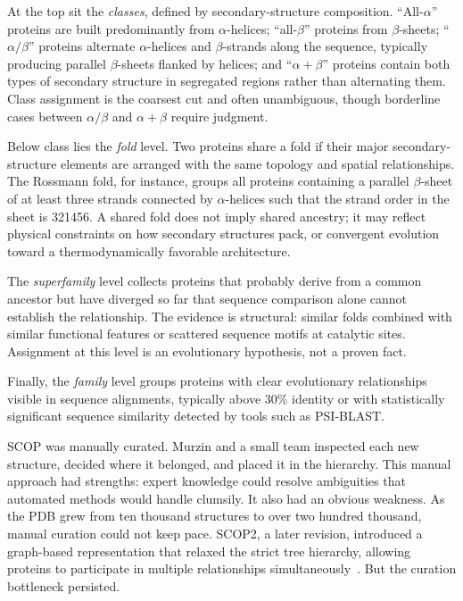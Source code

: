 At the top sit the \emph{classes}, defined by secondary-structure composition.
``All-$\alpha$'' proteins are built predominantly from $\alpha$-helices;
``all-$\beta$'' proteins from $\beta$-sheets; ``$\alpha/\beta$'' proteins
alternate $\alpha$-helices and $\beta$-strands along the sequence, typically
producing parallel $\beta$-sheets flanked by helices; and ``$\alpha+\beta$''
proteins contain both types of secondary structure in segregated regions rather
than alternating them. Class assignment is the coarsest
cut and often unambiguous, though borderline cases between $\alpha/\beta$ and
$\alpha+\beta$ require judgment.

Below class lies the \emph{fold} level. Two proteins share a fold if their major
secondary-structure elements are arranged with the same topology and spatial
relationships. The Rossmann fold, for instance, groups all proteins containing a
parallel $\beta$-sheet of at least three strands connected by $\alpha$-helices
such that the strand order in the sheet is 321456. A shared fold does not imply
shared ancestry; it may reflect physical constraints on how secondary structures
pack, or convergent evolution toward a thermodynamically favorable architecture.

The \emph{superfamily} level collects proteins that probably derive from a common
ancestor but have diverged so far that sequence comparison alone cannot establish
the relationship. The evidence is structural: similar folds combined with similar
functional features or scattered sequence motifs at catalytic sites. Assignment at
this level is an evolutionary hypothesis, not a proven fact.

Finally, the \emph{family} level groups proteins with clear evolutionary
relationships visible in sequence alignments, typically above 30\% identity or
with statistically significant sequence similarity detected by tools such as
PSI-BLAST.

SCOP was manually curated. Murzin and a small team inspected each new structure,
decided where it belonged, and placed it in the hierarchy. This manual approach
had strengths: expert knowledge could resolve ambiguities that automated methods
would handle clumsily. It also had an obvious weakness. As the PDB grew from ten
thousand structures to over two hundred thousand, manual curation could not keep
pace. SCOP2, a later revision, introduced a graph-based representation that
relaxed the strict tree hierarchy, allowing proteins to participate in multiple
relationships simultaneously~\cite{andreeva2014}. But the curation bottleneck persisted.


